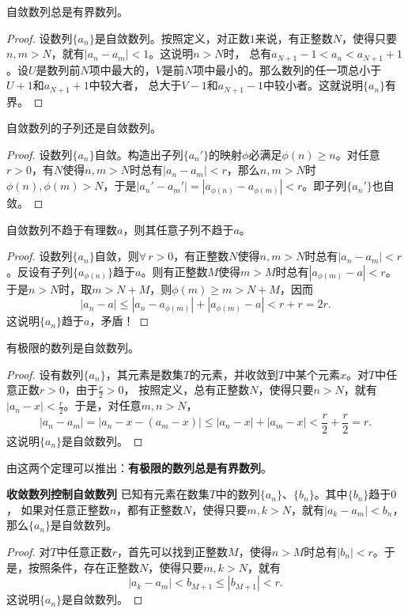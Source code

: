 \documentclass[12pt,UTF8]{ctexbook}
\begin{document}
\begin{appendix}
\begin{tm}\label{tm:a-0-60}
    自敛数列总是有界数列。
\end{tm}
\begin{proof}
    设数列$\{a_n\}$是自敛数列。按照定义，对正数$1$来说，有正整数$N$，使得只要$n,m>N$，就有$|a_n - a_m| < 1$。这说明$n>N$时，
    总有$a_{N+1} - 1 < a_n < a_{N+1} + 1$。设$U$是数列前$N$项中最大的，$V$是前$N$项中最小的。那么数列的任一项总小于$U+1$和$a_{N+1}+1$中较大者，
    总大于$V-1$和$a_{N+1}-1$中较小者。这就说明$\{a_n\}$有界。
\end{proof}

\begin{tm}\label{tm:a-0-65}
    自敛数列的子列还是自敛数列。
\end{tm}
\begin{proof}
    设数列$\{a_n\}$自敛。构造出子列$\{a_n'\}$的映射$\phi$必满足$\phi(n)\geqslant n$。对任意$r>0$，有$N$使得$n,m>N$时总有$|a_n - a_m| < r$，那么$n,m>N$时$\phi(n),\phi(m)>N$，于是$|a_n' - a_m'| = |a_{\phi(n)} - a_{\phi(m)}| < r$。即子列$\{a_n'\}$也自敛。
\end{proof}

\begin{tm}\label{tm:a-0-67}
    自敛数列不趋于有理数$a$，则其任意子列不趋于$a$。
\end{tm}
\begin{proof}
    设数列$\{a_n\}$自敛，则$\forall \, r > 0$，有正整数$N$使得$n,m>N$时总有$|a_n - a_m| < r$。反设有子列$\{a_{\phi(n)}\}$趋于$a$。则有正整数$M$使得$m>M$时总有$|a_{\phi(m)} - a| < r$。于是$n>N$时，取$m>N+M$，则$\phi(m)\geqslant m>N+M$，因而
    $$ |a_n - a| \leqslant |a_n - a_{\phi(m)}| + |a_{\phi(m)} - a| < r + r = 2r.$$
    这说明$\{a_n\}$趋于$a$，矛盾！
\end{proof}

\begin{tm}\label{tm:a-0-70}
    有极限的数列是自敛数列。
\end{tm}
\begin{proof}
    设有数列$\{a_n\}$，其元素是数集$T$的元素，并收敛到$T$中某个元素$x$。对$T$中任意正数$r>0$，由于$\frac{r}{2}>0$，
    按照定义，总有正整数$N$，使得只要$n>N$，就有$|a_n - x| < \frac{r}{2}$。于是，对任意$m,n>N$，
    $$ |a_n - a_m| = |a_n - x - (a_m - x)| \leqslant |a_n - x| + |a_m - x| < \frac{r}{2} + \frac{r}{2} = r.$$
    这说明$\{a_n\}$是自敛数列。
\end{proof}

由这两个定理可以推出：\textbf{有极限的数列总是有界数列}。

\begin{tm}{\textbf{收敛数列控制自敛数列}}\label{tm:a-0-80}
    已知有元素在数集$T$中的数列$\{a_n\}$、$\{b_n\}$。其中$\{b_n\}$趋于$0$，
    如果对任意正整数$n$，都有正整数$N$，使得只要$m,k>N$，就有$|a_k - a_m| < b_n$，那么$\{a_n\}$是自敛数列。
\end{tm}
\begin{proof}
    对$T$中任意正数$r$，首先可以找到正整数$M$，使得$n>M$时总有$|b_n| < r$。于是，按照条件，存在正整数$N$，使得只要$m,k>N$，就有
    $$|a_k - a_m| < b_{M+1} \leqslant |b_{M+1}| < r.$$
    这说明$\{a_n\}$是自敛数列。
\end{proof}


\end{appendix}
\end{document}
